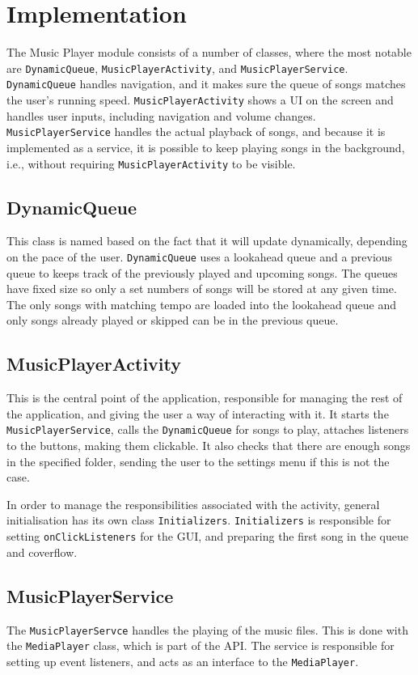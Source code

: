\section{Implementation}
The Music Player module consists of a number of classes, where the most notable are \texttt{DynamicQueue}, \texttt{MusicPlayerActivity}, and \texttt{MusicPlayerService}. \texttt{DynamicQueue} handles navigation, and it makes sure the queue of songs matches the user's running speed. \texttt{MusicPlayerActivity} shows a UI on the screen and handles user inputs, including navigation and volume changes. \texttt{MusicPlayerService} handles the actual playback of songs, and because it is implemented as a service, it is possible to keep playing songs in the background, i.e., without requiring \texttt{MusicPlayerActivity} to be visible.

\subsection{DynamicQueue}
\label{sec:dynamicQueue}
This class is named based on the fact that it will update dynamically, depending on the pace of the user. \texttt{DynamicQueue} uses a lookahead queue and a previous queue to keeps track of the previously played and upcoming songs. The queues have fixed size so only a set numbers of songs will be stored at any given time. The only songs with matching tempo are loaded into the lookahead queue and only songs already played or skipped can be in the previous queue. 

\subsection{MusicPlayerActivity}
This is the central point of the application, responsible for managing the rest of the application, and giving the user a way of interacting with it. It starts the \texttt{MusicPlayerService}, calls the \texttt{DynamicQueue} for songs to play, attaches listeners to the buttons, making them clickable. It also checks that there are enough songs in the specified folder, sending the user to the settings menu if this is not the case.

In order to manage the responsibilities associated with the activity, general initialisation has its own class \texttt{Initializers}. \texttt{Initializers} is responsible for setting \texttt{onClickListeners} for the GUI, and preparing the first song in the queue and coverflow. 

\subsection{MusicPlayerService} 
The \texttt{MusicPlayerServce} handles the playing of the music files. This is done with the \texttt{MediaPlayer} class, which is part of the \citet{android:MediaPlayer} API. The service is responsible for setting up event listeners, and acts as an interface to the \texttt{MediaPlayer}.  

